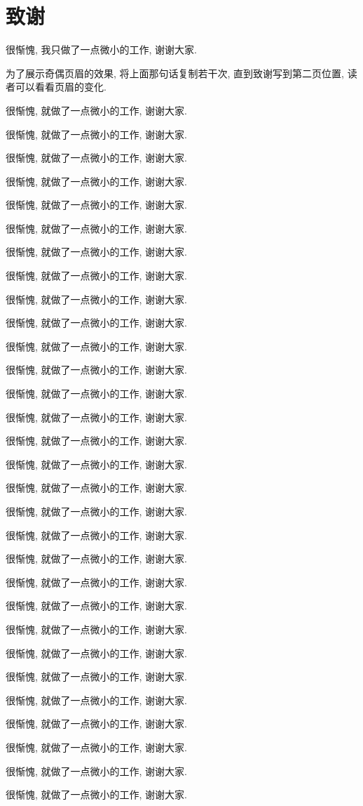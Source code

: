 \section*{致谢}
很惭愧, 我只做了一点微小的工作, 谢谢大家.

为了展示奇偶页眉的效果, 将上面那句话复制若干次, 直到致谢写到第二页位置, 读者可以看看页眉的变化.

很惭愧, 就做了一点微小的工作, 谢谢大家.

很惭愧, 就做了一点微小的工作, 谢谢大家.

很惭愧, 就做了一点微小的工作, 谢谢大家.

很惭愧, 就做了一点微小的工作, 谢谢大家.

很惭愧, 就做了一点微小的工作, 谢谢大家.

很惭愧, 就做了一点微小的工作, 谢谢大家.

很惭愧, 就做了一点微小的工作, 谢谢大家.

很惭愧, 就做了一点微小的工作, 谢谢大家.

很惭愧, 就做了一点微小的工作, 谢谢大家.

很惭愧, 就做了一点微小的工作, 谢谢大家.

很惭愧, 就做了一点微小的工作, 谢谢大家.

很惭愧, 就做了一点微小的工作, 谢谢大家.

很惭愧, 就做了一点微小的工作, 谢谢大家.

很惭愧, 就做了一点微小的工作, 谢谢大家.

很惭愧, 就做了一点微小的工作, 谢谢大家.

很惭愧, 就做了一点微小的工作, 谢谢大家.

很惭愧, 就做了一点微小的工作, 谢谢大家.

很惭愧, 就做了一点微小的工作, 谢谢大家.

很惭愧, 就做了一点微小的工作, 谢谢大家.

很惭愧, 就做了一点微小的工作, 谢谢大家.

很惭愧, 就做了一点微小的工作, 谢谢大家.

很惭愧, 就做了一点微小的工作, 谢谢大家.

很惭愧, 就做了一点微小的工作, 谢谢大家.

很惭愧, 就做了一点微小的工作, 谢谢大家.

很惭愧, 就做了一点微小的工作, 谢谢大家.

很惭愧, 就做了一点微小的工作, 谢谢大家.

很惭愧, 就做了一点微小的工作, 谢谢大家.

很惭愧, 就做了一点微小的工作, 谢谢大家.

很惭愧, 就做了一点微小的工作, 谢谢大家.

很惭愧, 就做了一点微小的工作, 谢谢大家.
